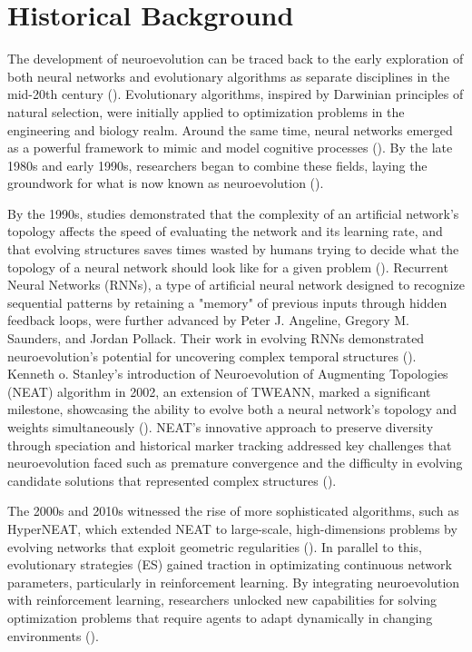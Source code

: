 \section{Historical Background}\label{sec:ne_historical_background}
The development of neuroevolution can be traced back to the early exploration of both neural networks and evolutionary algorithms as separate disciplines in the mid-20th century (\cite{stanley2002evolving}). Evolutionary algorithms, inspired by Darwinian principles of natural selection, were initially applied to optimization problems in the engineering and biology realm. Around the same time, neural networks emerged as a powerful framework to mimic and model cognitive processes (\cite{stanley2002evolving}). By the late 1980s and early 1990s, researchers began to combine these fields, laying the groundwork for what is now known as neuroevolution (\cite{stanley2002evolving}).

\parbreak\noindent By the 1990s, studies demonstrated that the complexity of an artificial network's topology affects the speed of evaluating the network and its learning rate, and that evolving structures saves times wasted by humans trying to decide what the topology of a neural network should look like for a given problem (\cite{stanley2002evolving}). Recurrent Neural Networks (RNNs), a type of artificial neural network designed to recognize sequential patterns by retaining a "memory" of previous inputs through hidden feedback loops, were further advanced by Peter J. Angeline, Gregory M. Saunders, and Jordan Pollack. Their work in evolving RNNs demonstrated neuroevolution's potential for uncovering complex temporal structures (\cite{angeline1994evolutionary}). Kenneth o. Stanley's introduction of Neuroevolution of Augmenting Topologies (NEAT) algorithm in 2002, an extension of TWEANN, marked a significant milestone, showcasing the ability to evolve both a neural network's topology and weights simultaneously (\cite{stanley2002evolving}). NEAT's innovative approach to preserve diversity through speciation and historical marker tracking addressed key challenges that neuroevolution faced such as premature convergence and the difficulty in evolving candidate solutions that represented complex structures (\cite{stanley2002evolving}).

\parbreak\noindent The 2000s and 2010s witnessed the rise of more sophisticated algorithms, such as HyperNEAT, which extended NEAT to large-scale, high-dimensions problems by evolving networks that exploit geometric regularities (\cite{stanley2009hypercube}). In parallel to this, evolutionary strategies (ES) gained traction in optimizating continuous network parameters, particularly in reinforcement learning. By integrating neuroevolution with reinforcement learning, researchers unlocked new capabilities for solving optimization problems that require agents to adapt dynamically in changing environments (\cite{igel2003neuroevolution}).

